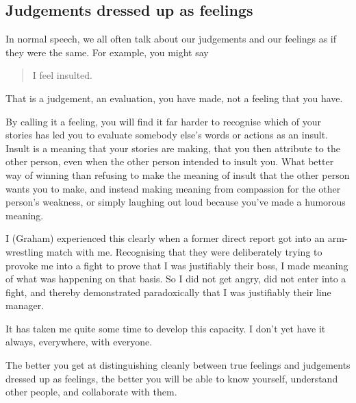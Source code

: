 

\subsection{Judgements dressed up as feelings}
In normal speech, we all often talk about our judgements  and our feelings as if they were the same. For example, you might say 


\begin{quote}
I feel insulted.
\end{quote}


That is a judgement, an evaluation, you have made, not a feeling that you have. 


By calling it a feeling, you will find it far harder to recognise which of your stories has led you to evaluate somebody else's words or actions as an insult. Insult is a meaning that your stories are making, that you then attribute to the other person, even when the other person intended to insult you. What better way of winning than refusing to make the meaning of insult that the other person wants you to make, and instead making meaning from compassion for the other person's weakness, or simply laughing out loud because you've made a humorous meaning.


\begin{longstoryblock}
I (Graham) experienced this clearly when a former direct report got into an arm-wrestling match with me. Recognising that they were deliberately trying to provoke me into a fight to prove that I was justifiably their boss, I made meaning of what was happening on that basis. So I did not get angry, did not enter into a fight, and thereby demonstrated paradoxically that I was justifiably their line manager.


It has taken me quite some time to develop this capacity. I don't yet have it always, everywhere, with everyone.
\end{longstoryblock}


The better you get at distinguishing cleanly between true feelings and judgements dressed up as feelings, the better you will be able to know yourself, understand other people, and collaborate with them.




